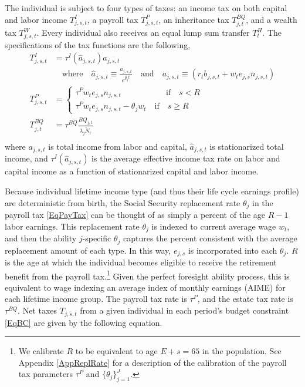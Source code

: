 \documentclass[letterpaper,12pt]{article}
\theoremstyle{definition}
\begin{document}
\begin{spacing}{1.5}
    The individual is subject to four types of taxes: an income tax on both capital and labor income $T^I_{j,s,t}$, a payroll tax $T^P_{j,s,t}$, an inheritance tax $T^{BQ}_{j,t}$, and a wealth tax $T^W_{j,s,t}$. Every individual also receives an equal lump sum transfer $T^H_{t}$. The specifications of the tax functions are the following,
    \begin{align}
      T^I_{j,s,t} & = \tau^I(\hat{a}_{j,s,t})a_{j,s,t} \label{EqIncTax} \\
      & \quad\text{where}\quad \hat{a}_{j,s,t}\equiv\frac{a_{j,s,t}}{e^{g_y t}} \quad\text{and}\quad a_{j,s,t} \equiv (r_t b_{j,s,t} + w_t e_{j,s}n_{j,s,t}) \nonumber \\
      T^P_{j,s,t} & =
        \begin{cases}
          \tau^P w_t e_{j,s}n_{j,s,t} \quad\quad\quad\quad\quad\:\:\text{if}\quad s<R \\
          \tau^P w_t e_{j,s}n_{j,s,t} - \theta_j w_t \quad\text{if}\quad s\geq R
        \end{cases} \label{EqPayTax} \\
      T^{BQ}_{j,t} & = \tau^{BQ} \frac{BQ_{j,t}}{\lambda_j\tilde{N}_t} \label{EqInherTax}\\
    \end{align}
    where $a_{j,s,t}$ is total income from labor and capital, $\hat{a}_{j,s,t}$ is stationarized total income, and $\tau^I(\hat{a}_{j,s,t})$ is the average effective income tax rate on labor and capital income as a function of stationarized capital and labor income.

    Because individual lifetime income type (and thus their life cycle earnings profile) are deterministic from birth, the Social Security replacement rate $\theta_j$ in the payroll tax \eqref{EqPayTax} can be thought of as simply a percent of the age $R-1$ labor earnings. This replacement rate $\theta_j$ is indexed to current average wage $w_t$, and then the ability $j$-specific $\theta_j$ captures the percent consistent with the average replacement amount of each type. In this way, $e_{j,s}$ is incorporated into each $\theta_j$. $R$ is the age at which the individual becomes eligible to receive the retirement benefit from the payroll tax.\footnote{We calibrate $R$ to be equivalent to age $E+s=65$ in the population. See Appendix \ref{AppReplRate} for a description of the calibration of the payroll tax parameters $\tau^P$ and $\{\theta_j\}_{j=1}^J$.} Given the perfect foresight ability process, this is equivalent to wage indexing an average index of monthly earnings (AIME) for each lifetime income group. The payroll tax rate is $\tau^P$, and the estate tax rate is $\tau^{BQ}$. Net taxes $T_{j,s,t}$ from a given individual in each period's budget constraint \eqref{EqBC} are given by the following equation.


\end{spacing}
\end{document}
